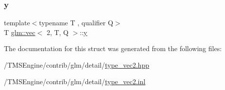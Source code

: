 \subsubsection{\texorpdfstring{y}{y}}
{\footnotesize\ttfamily template$<$typename T , qualifier Q$>$ \\
T \hyperlink{structglm_1_1vec}{glm\+::vec}$<$ 2, T, Q $>$\+::\hyperlink{_s_d_l__opengl_8h_a1675d9d7bb68e1657ff028643b4037e3}{y}}



The documentation for this struct was generated from the following files\+:\begin{DoxyCompactItemize}
\item 
/\+T\+M\+S\+Engine/contrib/glm/detail/\hyperlink{type__vec2_8hpp}{type\+\_\+vec2.\+hpp}\item 
/\+T\+M\+S\+Engine/contrib/glm/detail/\hyperlink{type__vec2_8inl}{type\+\_\+vec2.\+inl}\end{DoxyCompactItemize}
